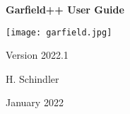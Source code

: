 \begin{titlepage}
  {
  \centering
  \sffamily
  \linespread{1.5}

  \vspace{3cm} 

  \huge{\textbf{Garfield++ User Guide}}

  \vspace{2cm}

  \texttt{[image: garfield.jpg]}

  \vspace{2cm}

  \large
  Version 2022.1

  \vspace{2cm}
  \large
  H. Schindler

  \vfill

  January 2022

  }
\end{titlepage}
